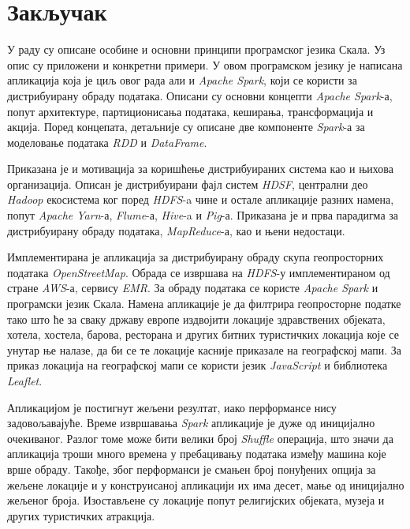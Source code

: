 \documentclass[12pt,oneside]{memoir}
\begin{document}
\chapter{Закључак}
\label{chp:zakljucak}

У раду су описане особине и основни принципи програмског језика Скала. Уз опис су приложени и конкретни примери. У овом програмском језику је написана апликација која је циљ овог рада али и \textit{Apache Spark}, који се користи за дистрибуирану обраду података. Описани су основни концепти \textit{Apache Spark}-а, попут архитектуре, партиционисања података, кеширања, трансформација и акција. Поред концепата, детаљније су описане две компоненте \textit{Spark}-а за моделовање података \textit{RDD} и \textit{DataFrame}.

Приказана је и мотивација за коришћење дистрибуираних система као и њихова организација. Описан је дистрибуирани фајл систем \textit{HDSF}, централни део \textit{Hadoop} екосистема ког поред \textit{HDFS}-a чине и остале апликације разних намена, попут \textit{Apache Yarn}-а, \textit{Flume}-а, \textit{Hive}-a и \textit{Pig}-а. Приказана је и прва парадигма за дистрибуирану обраду података, \textit{MapReduce}-а, као и њени недостаци.

Имплементирана је апликација за дистрибуирану обраду скупа геопросторних података \textit{OpenStreetMap}. Обрада се извршава на \textit{HDFS}-у имплементираном од стране \textit{AWS}-а, сервису \textit{EMR}. За обраду података се користе \textit{Apache Spark} и програмски језик Скала. Намена апликације је да филтрира геопросторне податке тако што ће за сваку државу европе издвојити локације здравствених објеката, хотела, хостела, барова, ресторана и других битних туристичких локација које се унутар ње налазе, да би се те локације касније приказале на географској мапи. За приказ локација на географској мапи се користи језик \textit{JavaScript} и библиотека \textit{Leaflet}.

Апликацијом је постигнут жељени резултат, иако перформансе нису задовољавајуће. Време извршавања \textit{Spark} апликације је дуже од иницијално очекиваног. Разлог томе може бити велики број \textit{Shuffle} операција, што значи да апликација троши много времена у пребацивању података између машина које врше обраду. Такође, због перформанси је смањен број понуђених опција за жељене локације и у конструисаној апликацији их има десет, мање од иницијално жељеног броја. Изостављене су локације попут религијских објеката, музеја и других туристичких атракција.
\end{document}
